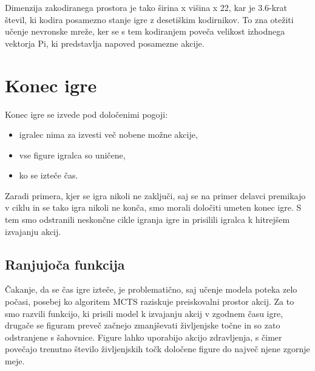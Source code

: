 \documentclass[a4paper, 12pt]{book}
\begin{document}
Dimenzija zakodiranega prostora je tako širina x višina x 22, kar je 3.6-krat števil, ki kodira posamezno stanje igre z desetiškim kodirnikov.
To zna otežiti učenje nevronske mreže, ker se s tem kodiranjem poveča velikost izhodnega vektorja Pi, ki predstavlja napoved posamezne akcije.

\section{Konec igre}
\label{sKonecIgre}
Konec igre se izvede pod določenimi pogoji:
\begin{itemize}
	\item igralec nima za izvesti več nobene možne akcije,
	\item vse figure igralca so uničene,
	\item ko se izteče čas.
\end{itemize}
\noindent
Zaradi primera, kjer se igra nikoli ne zaključi, saj se na primer delavci premikajo v ciklu in se tako igra nikoli ne konča, smo morali določiti umeten konec igre.
S tem smo odstranili neskončne cikle igranja igre in prisilili igralca k hitrejšem izvajanju akcij.

\subsection{Ranjujoča funkcija}
\label{sKillFunction}
Čakanje, da se čas igre izteče, je problematično, saj učenje modela poteka zelo počasi, posebej ko algoritem MCTS raziskuje preiskovalni prostor akcij.
Za to smo razvili funkcijo, ki prisili model k izvajanju akcij v zgodnem času igre, drugače se figuram preveč začnejo zmanjševati življenjske točne in so zato odstranjene s šahovnice.
Figure lahko uporabijo akcijo zdravljenja, s čimer povečajo trenutno število življenjskih točk določene figure do največ njene zgornje meje.
\end{document}
